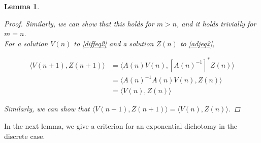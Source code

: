 \documentclass[12pt]{article}
\newtheorem{lemma}{Lemma}
\begin{document}
\begin{lemma}
\begin{proof}
Similarly, we can show that this holds for $m > n$, and it holds trivially for $m = n$.\\

For a solution $V(n)$ to \eqref{diffeq2} and a solution $Z(n)$ to \eqref{adjeq2},

\begin{align*}
\langle V(n+1), Z(n+1) \rangle &= 
\langle A(n) V(n), [A(n)^{-1}]^* Z(n) \rangle \\
&= \langle A(n)^{-1} A(n) V(n), Z(n) \rangle \\
&= \langle V(n), Z(n) \rangle
\end{align*}

Similarly, we can show that $\langle V(n+1), Z(n+1) \rangle = \langle V(n), Z(n) \rangle$.

\end{proof}
\end{lemma}

In the next lemma, we give a criterion for an exponential dichotomy in the discrete case.

\end{document}
